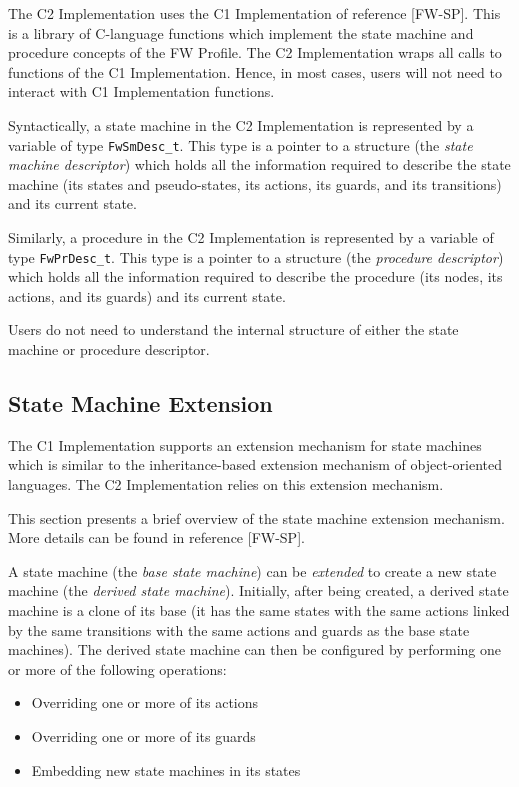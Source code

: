 \documentclass{pnp_article}
\begin{document}
The C2 Implementation uses the C1 Implementation of reference [FW-SP]. This is a library of C-language functions which implement the state machine and procedure concepts of the FW Profile. The C2 Implementation wraps all calls to functions of the C1 Implementation. Hence, in most cases, users will not need to interact with C1 Implementation functions.

Syntactically, a state machine in the C2 Implementation is represented by a variable of type \texttt{FwSmDesc\_t}. This type is a pointer to a structure (the \textit{state machine descriptor}) which holds all the information required to describe the state machine (its states and pseudo-states, its actions, its guards, and its transitions) and its current state. 

Similarly, a procedure in the C2 Implementation is represented by a variable of type \texttt{FwPrDesc\_t}. This type is a pointer to a structure (the \textit{procedure descriptor}) which holds all the information required to describe the procedure (its nodes, its actions, and its guards) and its current state. 

Users do not need to understand the internal structure of either the state machine or procedure descriptor.

\subsection{State Machine Extension}\label{sec:SmExtension} 
The C1 Implementation supports an extension mechanism for state machines which is similar to the inheritance-based extension mechanism of object-oriented languages. The C2 Implementation relies on this extension mechanism.

This section presents a brief overview of the state machine extension mechanism. More details can be found in reference [FW-SP]. 

A state machine (the \emph{base state machine}) can be \emph{extended} to create a new state machine (the \emph{derived state machine}). Initially, after being created, a derived state machine is a clone of its base (it has the same states with the same actions linked by the same transitions with the same actions and guards as the base state machines). The derived state machine can then be configured by performing one or more of the following operations: 

\begin{itemize}
\item Overriding one or more of its actions 
\item Overriding one or more of its guards 
\item Embedding new state machines in its states
\end{itemize}
\end{document}
